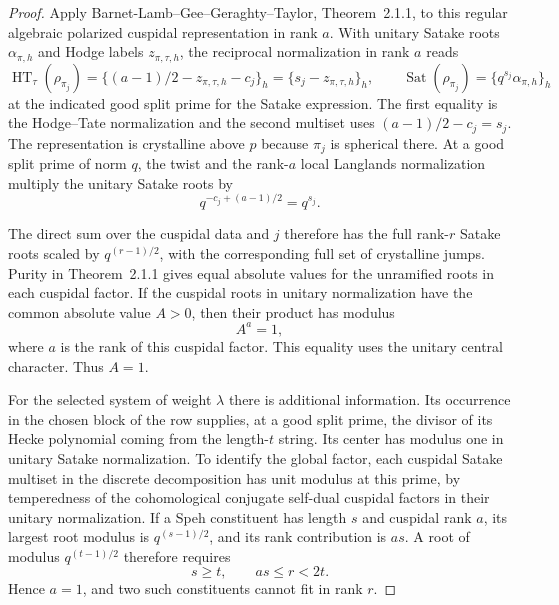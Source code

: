 \begin{proof}
Apply
Barnet-Lamb--Gee--Geraghty--Taylor, Theorem~2.1.1, to this
regular algebraic polarized cuspidal representation
in rank \(a\). With unitary Satake roots \(\alpha_{\pi,h}\) and Hodge labels
\(z_{\pi,\tau,h}\), the reciprocal normalization in rank \(a\)
reads
\[
 \operatorname{HT}_\tau(\rho_{\pi_j})
     =\{(a-1)/2-z_{\pi,\tau,h}-c_j\}_h
     =\{s_j-z_{\pi,\tau,h}\}_h,\qquad
 \operatorname{Sat}(\rho_{\pi_j})=\{q^{s_j}\alpha_{\pi,h}\}_h
\]
at the indicated good split prime for the Satake expression.
The first equality is the Hodge--Tate normalization and the
second multiset uses \((a-1)/2-c_j=s_j\).
The representation is crystalline above \(p\) because
\(\pi_j\) is spherical there. At a good split prime of
norm \(q\), the twist and the rank-\(a\) local Langlands
normalization multiply the unitary Satake roots by
\[
 q^{-c_j+(a-1)/2}=q^{s_j}.
\]

The direct sum over the cuspidal data and \(j\) therefore
has the full rank-\(r\) Satake roots scaled by
\(q^{(r-1)/2}\), with the corresponding full set of
crystalline jumps. Purity in Theorem~2.1.1 gives equal
absolute values for the unramified roots in each
cuspidal factor. If the cuspidal roots in unitary normalization have the common absolute value \(A>0\), then their product has modulus
\[
 A^a=1,
\]
where \(a\) is the rank of this cuspidal factor. This equality uses the unitary central character. Thus \(A=1\).
\cite{labesse-cm,blgg-weight}\label{cor:lift-frame-galois-3}

For the selected system of weight \(\lambda\) there is
additional information. Its occurrence in the chosen
block of the row supplies, at a good split prime, the
divisor of its Hecke polynomial coming from the
length-\(t\) string. Its center has modulus one in
unitary Satake normalization. To identify the global
factor, each cuspidal Satake multiset in the discrete
decomposition has unit modulus at this prime, by
temperedness of the cohomological conjugate self-dual
cuspidal factors in their unitary normalization. If a Speh constituent has length \(s\) and cuspidal rank \(a\),
its largest root modulus is \(q^{(s-1)/2}\), and its rank
contribution is \(as\). A root of modulus \(q^{(t-1)/2}\)
therefore requires
\[
       s\ge t,\qquad as\le r<2t .
\]
Hence \(a=1\), and two such constituents cannot fit in rank \(r\).


\end{proof}
